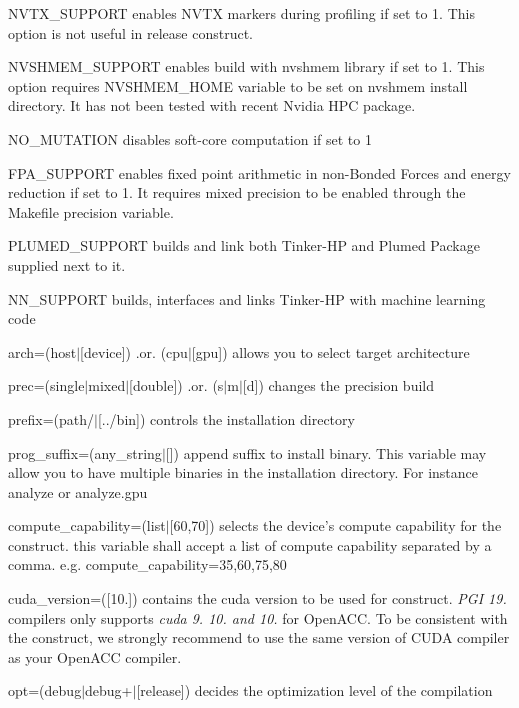 \begin{DoxyItemize}
\item {\ttfamily N\-V\-T\-X\-\_\-\-S\-U\-P\-P\-O\-R\-T} enables N\-V\-T\-X markers during profiling if set to 1. This option is not useful in release construct.
\item {\ttfamily N\-V\-S\-H\-M\-E\-M\-\_\-\-S\-U\-P\-P\-O\-R\-T} enables build with nvshmem library if set to 1. This option requires {\ttfamily N\-V\-S\-H\-M\-E\-M\-\_\-\-H\-O\-M\-E} variable to be set on nvshmem install directory. It has not been tested with recent Nvidia H\-P\-C package.
\item {\ttfamily N\-O\-\_\-\-M\-U\-T\-A\-T\-I\-O\-N} disables soft-\/core computation if set to 1
\item {\ttfamily F\-P\-A\-\_\-\-S\-U\-P\-P\-O\-R\-T} enables fixed point arithmetic in non-\/\-Bonded Forces and energy reduction if set to 1. It requires mixed precision to be enabled through the Makefile precision variable.
\item {\ttfamily P\-L\-U\-M\-E\-D\-\_\-\-S\-U\-P\-P\-O\-R\-T} builds and link both Tinker-\/\-H\-P and Plumed Package supplied next to it.
\item {\ttfamily N\-N\-\_\-\-S\-U\-P\-P\-O\-R\-T} builds, interfaces and links Tinker-\/\-H\-P with machine learning code
\item {\ttfamily arch=(host$|$\mbox{[}device\mbox{]}) .or. (cpu$|$\mbox{[}gpu\mbox{]})} allows you to select target architecture
\item {\ttfamily prec=(single$|$mixed$|$\mbox{[}double\mbox{]}) .or. (s$|$m$|$\mbox{[}d\mbox{]})} changes the precision build
\item {\ttfamily prefix=(path/$|$\mbox{[}../bin\mbox{]})} controls the installation directory
\item {\ttfamily prog\-\_\-suffix=(any\-\_\-string$|$\mbox{[}\mbox{]})} append suffix to install binary. This variable may allow you to have multiple binaries in the installation directory. For instance {\ttfamily analyze} or {\ttfamily analyze.\-gpu}
\item {\ttfamily compute\-\_\-capability=(list$|$\mbox{[}60,70\mbox{]})} selects the device's compute capability for the construct. this variable shall accept a list of compute capability separated by a comma. e.\-g. {\ttfamily compute\-\_\-capability=35,60,75,80}
\item {\ttfamily cuda\-\_\-version=(\mbox{[}10.\mbox{]})} contains the cuda version to be used for construct. {\itshape P\-G\-I 19.} compilers only supports {\itshape cuda 9. 10. and 10.} for Open\-A\-C\-C. To be consistent with the construct, we strongly recommend to use the same version of C\-U\-D\-A compiler as your Open\-A\-C\-C compiler.
\item {\ttfamily opt=(debug$|$debug+$|$\mbox{[}release\mbox{]})} decides the optimization level of the compilation
\end{DoxyItemize}

